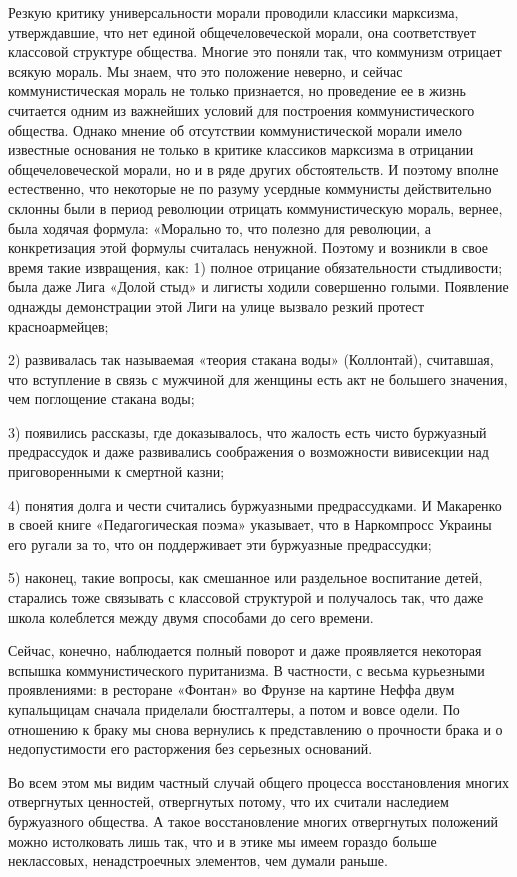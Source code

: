 Резкую критику универсальности морали проводили классики марксизма,
утверждавшие, что нет единой общечеловеческой морали, она
соответствует классовой структуре общества. Многие это поняли так, что
коммунизм отрицает всякую мораль. Мы знаем, что это положение неверно,
и сейчас коммунистическая мораль не только признается, но проведение
ее в жизнь считается одним из важнейших условий для построения
коммунистического общества. Однако мнение об отсутствии
коммунистической морали имело известные основания не только в критике
классиков марксизма в отрицании общечеловеческой морали, но и в ряде
других обстоятельств. И поэтому вполне естественно, что некоторые не
по разуму усердные коммунисты действительно склонны были в период
революции отрицать коммунистическую мораль, вернее, была ходячая
формула: «Морально то, что полезно для революции, а конкретизация этой
формулы считалась ненужной. Поэтому и возникли в свое время такие
извращения, как: 1) полное отрицание обязательности стыдливости; была
даже Лига «Долой стыд» и лигисты ходили совершенно голыми. Появление
однажды демонстрации этой Лиги на улице вызвало резкий протест
красноармейцев;

2) развивалась так называемая «теория стакана воды» (Коллонтай),
считавшая, что вступление в связь с мужчиной для женщины есть акт не
большего значения, чем поглощение стакана воды;

3) появились рассказы, где доказывалось, что жалость есть чисто
буржуазный предрассудок и даже развивались соображения о возможности
вивисекции над приговоренными к смертной казни;

4) понятия долга и чести считались буржуазными предрассудками. И
Макаренко в своей книге «Педагогическая поэма» указывает, что в
Наркомпросс Украины его ругали за то, что он поддерживает эти
буржуазные предрассудки;

5) наконец, такие вопросы, как смешанное или раздельное воспитание
детей, старались тоже связывать с классовой структурой и получалось
так, что даже школа колеблется между двумя способами до сего времени.

Сейчас, конечно, наблюдается полный поворот и даже проявляется
некоторая вспышка коммунистического пуританизма. В частности, с весьма
курьезными проявлениями: в ресторане «Фонтан» во Фрунзе на картине
Неффа двум купальщицам сначала приделали бюстгалтеры, а потом и вовсе
одели. По отношению к браку мы снова вернулись к представлению о
прочности брака и о недопустимости его расторжения без серьезных
оснований.

Во всем этом мы видим частный случай общего процесса восстановления
многих отвергнутых ценностей, отвергнутых потому, что их считали
наследием буржуазного общества. А такое восстановление многих
отвергнутых положений можно истолковать лишь так, что и в этике мы
имеем гораздо больше неклассовых, ненадстроечных элементов, чем думали
раньше.

